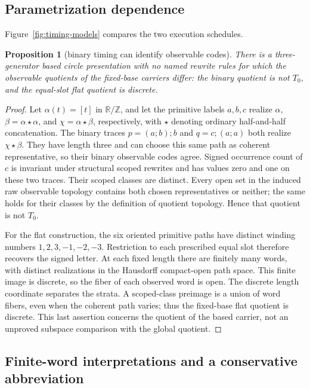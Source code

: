\documentclass[10pt,reqno]{amsart}
\theoremstyle{definition}
\theoremstyle{plain}
\newtheorem{proposition}[definition]{Proposition}
\theoremstyle{remark}
\newcommand{\Circle}{\mathbb R/\mathbb Z}
\begin{document}
\subsection{Parametrization dependence}
Figure~\ref{fig:timing-models} compares the two execution schedules.
\begin{proposition}[binary timing can identify observable codes]
\label{prop:binary-timing-collision}
There is a three-generator based circle presentation with no named rewrite
rules for which the observable quotients of the fixed-base carriers differ:
the binary quotient is not $T_0$, and the equal-slot flat quotient is discrete.
\end{proposition}
\begin{proof}
Let $\alpha(t)=[t]$ in $\Circle$, and let the primitive labels $a,b,c$
realize $\alpha$, $\beta=\alpha\star\alpha$, and
$\chi=\alpha\star\beta$, respectively, with $\star$ denoting ordinary
half-and-half concatenation. The binary traces
$p=(a;b);b$ and $q=c;(a;a)$ both realize $\chi\star\beta$.
They have length three and can choose this same path as coherent
representative, so their binary observable codes agree. Signed occurrence
count of $c$ is invariant under structural scoped rewrites and has values
zero and one on these two traces. Their scoped classes are distinct.
Every open set in the induced raw observable topology contains both chosen
representatives or neither; the same holds for their classes by the
definition of quotient topology. Hence that quotient is not $T_0$.

For the flat construction, the six oriented primitive paths have distinct
winding numbers $1,2,3,-1,-2,-3$. Restriction to each prescribed equal slot
therefore recovers the signed letter. At each fixed length there are finitely
many words, with distinct realizations in the Hausdorff compact-open path
space. This finite image is discrete, so the fiber of each observed word is
open. The discrete length coordinate separates the strata. A scoped-class
preimage is a union of word fibers, even when the coherent path varies;
thus the fixed-base flat quotient is discrete. This last assertion concerns
the quotient of the based carrier, not an unproved subspace comparison with
the global quotient.
\end{proof}




\subsection{Finite-word interpretations and a conservative abbreviation}
\label{sec:word-interpretations}
\end{document}
